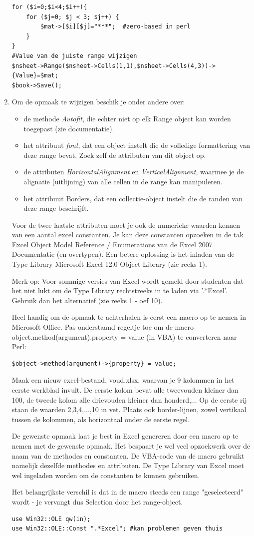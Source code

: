 \documentclass[11pt,a4paper]{report}
\begin{document}
\begin{enumerate}[resume]
\begin{lstlisting}
for ($i=0;$i<4;$i++){
	for ($j=0; $j < 3; $j++) {
		$mat->[$i][$j]="***";  #zero-based in perl
	}
}
#Value van de juiste range wijzigen
$nsheet->Range($nsheet->Cells(1,1),$nsheet->Cells(4,3))->{Value}=$mat;
$book->Save();
\end{lstlisting}
	\item Om de opmaak te wijzigen beschik je onder andere over:
	\begin{itemize}
		\item de methode \textit{Autofit}, die echter niet op elk Range object kan worden toegepast (zie documentatie).
		\item het attribuut \textit{font}, dat een object instelt die de volledige formattering van deze range bevat. Zoek zelf de attributen van dit object op.
		\item de attributen \textit{HorizontalAlignment} en \textit{VerticalAlignment}, waarmee je de alignatie (uitlijning) van alle cellen in de range kan manipuleren.
		\item het attribuut Borders, dat een collectie-object instelt die de randen van deze range beschrijft.
	\end{itemize}
	Voor de twee laatste attributen moet je ook de numerieke waarden kennen van een aantal excel constanten. Je kan deze constanten opzoeken in de tak Excel Object Model Reference / Enumerations van de Excel 2007 Documentatie (en overtypen). Een betere oplossing is het inladen van de Type Library Microsoft Excel 12.0 Object Library (zie reeks 1).
	\par Merk op: Voor sommige versies van Excel wordt gemeld door studenten dat het niet lukt om de Type Library rechtstreeks in te laden via '.*Excel'. Gebruik dan het alternatief (zie reeks  1 - oef 10).
	\par Heel handig om de opmaak te achterhalen is eerst een macro op te nemen in Microsoft Office. Pas onderstaand regeltje toe om de macro object.method(argument).property = value (in VBA) te converteren naar Perl:
\begin{lstlisting}
$object->method(argument)->{property} = value;
\end{lstlisting}
	Maak een nieuw excel-bestand, voud.xlsx, waarvan je 9 kolommen in het eerste werkblad invult. De eerste kolom bevat alle tweevouden kleiner dan 100, de tweede kolom alle drievouden kleiner dan honderd,...  Op de eerste rij staan de waarden 2,3,4,...,10 in vet. Plaats ook border-lijnen, zowel vertikaal tussen de kolommen, als horizontaal onder de eerste regel.
	\par De gewenste opmaak laat je best in Excel genereren door een macro op te nemen met de gewenste opmaak. Het bespaart je wel veel opzoekwerk over de naam van de methodes en constanten. De VBA-code van de macro gebruikt namelijk dezelfde methodes en attributen. De Type Library van Excel moet wel ingeladen worden om de constanten te kunnen gebruiken.
	\par Het belangrijkste verschil is dat in de macro steeds een range "geselecteerd" wordt - je vervangt dus Selection door het range-object.
\begin{lstlisting}
use Win32::OLE qw(in);
use Win32::OLE::Const ".*Excel"; #kan problemen geven thuis


\end{lstlisting}
\end{enumerate}
\end{document}
